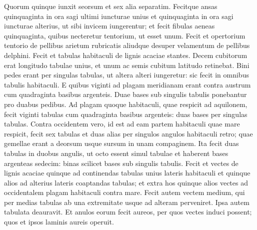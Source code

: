 \begin{biblechapter}
\begin{biblechapter}
\begin{biblechapter}
\begin{biblechapter}
\begin{biblechapter}
\begin{biblechapter}
\begin{biblechapter}
\begin{biblechapter}
\begin{biblechapter}
\begin{biblechapter}
\begin{biblechapter}
\begin{biblechapter}
\begin{biblechapter}
\begin{biblechapter}
\begin{biblechapter}
\begin{biblechapter}
\begin{biblechapter}
\begin{biblechapter}
\begin{biblechapter}
\begin{biblechapter}
\begin{biblechapter}
\begin{biblechapter}
\begin{biblechapter}
\begin{biblechapter}
\begin{biblechapter}
\begin{biblechapter}
\begin{biblechapter}
\begin{biblechapter}
\begin{biblechapter}
\begin{biblechapter}
\begin{biblechapter}
\begin{biblechapter}
\begin{biblechapter}
\begin{biblechapter}
\begin{biblechapter}
\begin{biblechapter}
\verse Quorum quinque iunxit seorsum et sex alia separatim.
 \verse Fecitque ansas quinquaginta in ora sagi ultimi iuncturae unius et quinquaginta in ora sagi iuncturae alterius, ut sibi invicem iungerentur; 
\verse et fecit fibulas aeneas quinquaginta, quibus necteretur tentorium, ut esset unum. 
\verse Fecit et opertorium tentorio de pellibus arietum rubricatis aliudque desuper velamentum de pellibus delphini.
 \verse Fecit et tabulas habitaculi de lignis acaciae stantes. 
\verse Decem cubitorum erat longitudo tabulae unius, et unum ac semis cubitum latitudo retinebat. 
 \verse Bini pedes erant per singulas tabulas, ut altera alteri iungeretur: sic fecit in omnibus tabulis habitaculi. 
\verse E quibus viginti ad plagam meridianam erant contra austrum 
\verse cum quadraginta basibus argenteis. Duae bases sub singulis tabulis ponebantur pro duabus pedibus. 
\verse Ad plagam quoque habitaculi, quae respicit ad aquilonem, fecit viginti tabulas 
\verse cum quadraginta basibus argenteis: duas bases per singulas tabulas. 
\verse Contra occidentem vero, id est ad eam partem habitaculi quae mare respicit, fecit sex tabulas 
\verse et duas alias per singulos angulos habitaculi retro; 
\verse quae gemellae erant a deorsum usque sursum in unam compaginem. Ita fecit duas tabulas in duobus angulis, 
\verse ut octo essent simul tabulae et haberent bases argenteas sedecim: binas scilicet bases sub singulis tabulis. 
\verse Fecit et vectes de lignis acaciae quinque ad continendas tabulas unius lateris habitaculi 
 \verse et quinque alios ad alterius lateris coaptandas tabulas; et extra hos quinque alios vectes ad occidentalem plagam habitaculi contra mare. 
\verse Fecit autem vectem medium, qui per medias tabulas ab una extremitate usque ad alteram perveniret. 
\verse Ipsa autem tabulata deauravit. Et anulos eorum fecit aureos, per quos vectes induci possent; quos et ipsos laminis aureis operuit.

\end{biblechapter}
\end{biblechapter}
\end{biblechapter}
\end{biblechapter}
\end{biblechapter}
\end{biblechapter}
\end{biblechapter}
\end{biblechapter}
\end{biblechapter}
\end{biblechapter}
\end{biblechapter}
\end{biblechapter}
\end{biblechapter}
\end{biblechapter}
\end{biblechapter}
\end{biblechapter}
\end{biblechapter}
\end{biblechapter}
\end{biblechapter}
\end{biblechapter}
\end{biblechapter}
\end{biblechapter}
\end{biblechapter}
\end{biblechapter}
\end{biblechapter}
\end{biblechapter}
\end{biblechapter}
\end{biblechapter}
\end{biblechapter}
\end{biblechapter}
\end{biblechapter}
\end{biblechapter}
\end{biblechapter}
\end{biblechapter}
\end{biblechapter}
\end{biblechapter}

